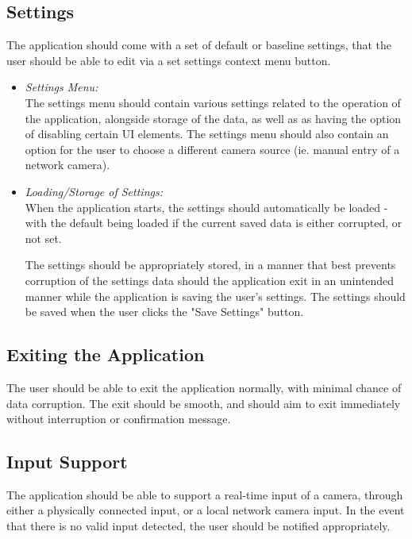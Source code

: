 \documentclass[conference]{IEEEtran}
\begin{document}
\subsection {Settings}

The application should come with a set of default or baseline settings, that the user should be able to edit via a set settings context menu button.
\newline
\begin{itemize}
\item{\emph{Settings Menu:}}\\
The settings menu should contain various settings related to the operation of the application, alongside storage of the data, as well as as having the option of disabling certain UI elements. The settings menu should also contain an option for the user to choose a different camera source (ie. manual entry of a network camera).
\newline

\item{\emph{Loading/Storage of Settings:}}\\
When the application starts, the settings should automatically be loaded - with the default being loaded if the current saved data is either corrupted, or not set. 

The settings should be appropriately stored, in a manner that best prevents corruption of the settings data should the application exit in an unintended manner while the application is saving the user's settings. The settings should be saved when the user clicks the "Save Settings" button.
\newline
\end{itemize}

\subsection{Exiting the Application}
The user should be able to exit the application normally, with minimal chance of data corruption. The exit should be smooth, and should aim to exit immediately without interruption or confirmation message.
\newline
\subsection{Input Support}

The application should be able to support a real-time input of a camera, through either a physically connected input, or a local network camera input. In the event that there is no valid input detected, the user should be notified appropriately.
\newline
\end{document}
